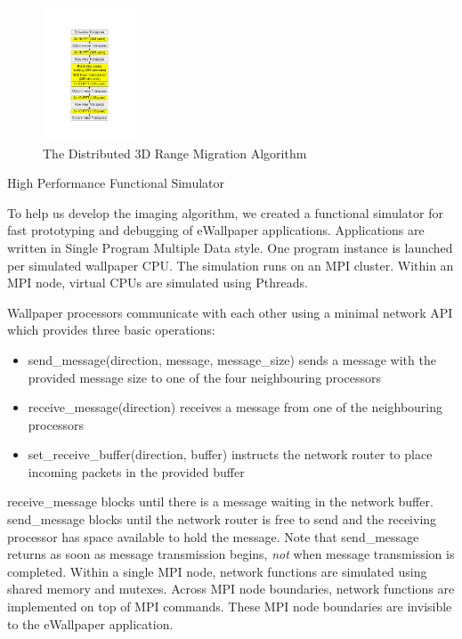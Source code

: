 \documentclass[twocolumn]{article}
\makeatletter
\def\section{\@startsection{section}{1}{\z@}{24pt plus 2 pt
minus 2 pt} {12pt plus 2pt minus 2pt}{\large\bf}}
\makeatother
\begin{document}
\begin{figure}[!h]
\centering
\includegraphics*[width=0.25\textwidth, viewport=170 125 420 700]{figures/algorithm.pdf}
\caption{The Distributed 3D Range Migration Algorithm}
\label{algorithm}
\end{figure}

\section{High Performance Functional Simulator}

To help us develop the imaging algorithm, we created a functional simulator for fast prototyping and debugging of eWallpaper applications. Applications are written in Single Program Multiple Data style. One program instance is launched per simulated wallpaper CPU. The simulation runs on an MPI cluster. Within an MPI node, virtual CPUs are simulated using Pthreads.

Wallpaper processors communicate with each other using a minimal network API which provides three basic operations:
\begin{itemize}
\item send\_message(direction, message, message\_size) sends a message with the provided message size to one of the four neighbouring processors
\item receive\_message(direction) receives a message from one of the neighbouring processors
\item set\_receive\_buffer(direction, buffer) instructs the network router to place incoming packets in the provided buffer
\end{itemize}

receive\_message blocks until there is a message waiting in the network buffer. send\_message blocks until the network router is free to send and the receiving processor has space available to hold the message. Note that send\_message returns as soon as message transmission begins, \emph{not} when message transmission is completed. Within a single MPI node, network functions are simulated using shared memory and mutexes. Across MPI node boundaries, network functions are implemented on top of MPI commands. These MPI node boundaries are invisible to the eWallpaper application.
\end{document}
